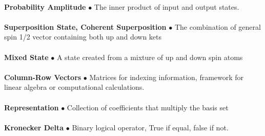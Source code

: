 \documentclass[paper=a4, fontsize=11pt]{scrartcl} %
\numberwithin{equation}{section} %
\numberwithin{figure}{section} %
\numberwithin{table}{section} %
\begin{document}
 \\
 \textbf{Probability Amplitude} $\bullet$ The inner product of input and output states. \\
 \\
 \textbf{Superposition State, Coherent Superposition} $\bullet$ The combination of general spin 1/2 vector containing both up and down kets\\
 \\
 \textbf{Mixed State} $\bullet$ A state created from a mixture of up and down spin atoms \\
\\
 \textbf{Column-Row Vectors} $\bullet$ Matrices for indexing information, framework for linear algebra or computational calculations. \\
 \\
 \textbf{Representation} $\bullet$ Collection of coefficients that multiply the basis set\\
 \\
 \textbf{Kronecker Delta} $\bullet$ Binary logical operator, True if equal, false if not.  \\
 \\
 
 
 
\end{document}
